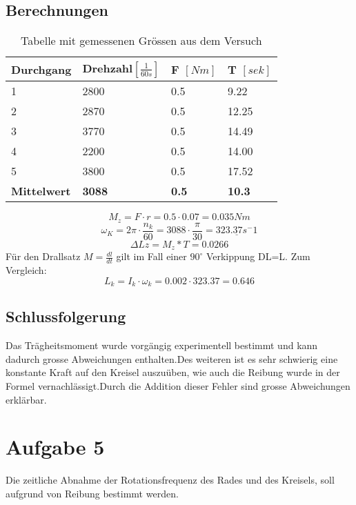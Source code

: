 \documentclass{article}
\begin{document}
\subsection{Berechnungen}
\begin{table}[H]
   \center
    \begin{tabular}{|l|l|l|l|}
        \hline
           Durchgang & Drehzahl$[\frac{1}{60s}]$ & F $[Nm]$&T $[sek]$     \\ \hline
        1         & 2800     & 0.5 & 9.22  \\ 
        2         & 2870     & 0.5 & 12.25  \\ 
        3         & 3770     & 0.5 & 14.49\\ 
        4         & 2200     & 0.5 & 14.00 \\ 
        5         & 3800     & 0.5 & 17.52 \\
        \hline
        \textbf{Mittelwert}&\textbf{3088}&\textbf{0.5}&\textbf{10.3}\\ \hline
    \end{tabular}
    \caption{Tabelle mit gemessenen Grössen aus dem Versuch}
\end{table}
\begin{equation}
M_z=F \cdot r = 0.5 \cdot 0.07 = 0.035Nm
\end{equation}
\begin{equation}
\omega_K= 2\pi \cdot\frac{n_k}{60} = 3088 \cdot \frac{\pi}{30} = \underline{323.37s^-1}
\end{equation}
\begin{equation}
\Delta Lz=M_z*T=0.0266 
\end{equation}
Für den Drallsatz $M = \frac{dl}{dt}$ gilt im Fall einer $90^\circ$ Verkippung DL=L.
Zum Vergleich:
\begin{equation}
L_k = I_k \cdot\omega_k = 0.002 \cdot  323.37 = 0.646
\end{equation}

\subsection{Schlussfolgerung}
Das Trägheitsmoment wurde vorgängig experimentell bestimmt und kann dadurch grosse Abweichungen enthalten.Des weiteren ist es sehr schwierig eine konstante Kraft auf den Kreisel auszuüben, wie auch die Reibung wurde in der Formel vernachlässigt.Durch die Addition dieser Fehler sind grosse Abweichungen erklärbar.
\newpage
\section{Aufgabe 5}
Die zeitliche Abnahme der Rotationsfrequenz des Rades und des Kreisels, soll aufgrund
von Reibung bestimmt werden.
\end{document}
